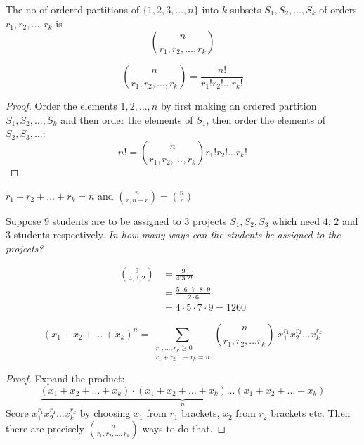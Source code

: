 \documentclass[twoside]{scrartcl}
\begin{document}
\begin{definition}
The no of ordered partitions of $\{1,2,3,\dots,n\}$ into $k$ subsets $S_1,S_2,\dots,S_k$ of orders $r_1,r_2,\dots,r_k$ is 
\[\binom{n}{r_1,r_2,\dots,r_k}\]	
\end{definition}\vspace*{5pt}

\begin{proposition}
	\[\binom{n}{r_1,r_2,\dots,r_k} = \frac{n!}{r_1!r_2!\dots r_k!}\]	
\end{proposition}
\begin{proof}
	Order the elements $1,2,\dots,n$ by first making an ordered partition $S_1,S_2,\dots,S_k$ and then order the elements of $S_1$, then order the elements of $S_2, S_3,\dots$: 
	\[n! = \binom{n}{r_1,r_2,\dots,r_k}r_1!r_2!\dots r_k!\]
\end{proof}

\begin{remark}
$r_1+r_2 + \dots + r_k = n$ and $\binom{n}{r,n-r} = \binom{n}{r}$	
\end{remark}

\begin{example}
Suppose $9$ students are to be assigned to $3$ projects $S_1,S_2,S_3$ which need $4,\,2$ and $3$ students respectively. 
\emph{In how many ways can the students be assigned to the projects?}

\[
\begin{aligned}
  \binom{9}{4,3,2} &= \frac{9!}{4!3!2!}\\
  &= \frac{5\cdot 6\cdot 7\cdot 8\cdot 9}{2\cdot 6}\\
  &= 4\cdot 5 \cdot 7 \cdot 9 = 1260
\end{aligned}
\]
\end{example}\vspace*{5pt}

\begin{theorem}
\[(x_1 + x_2 + \dots + x_k)^n = \sum_{\substack{r_1,\dots,r_k\geq 0\\r_1+r_2\dots+r_k = n}} \binom{n}{r_1,r_2,\dots r_k}\;x_1^{r_1}x_2^{r_2}\dots x_k^{r_k}\]
\end{theorem}

\begin{proof}
Expand the product:
\[\underbrace{(x_1+x_2+\dots+x_k)\cdot(x_1+x_2+\dots + x_k) \dots (x_1 + x_2 + \dots + x_k)}_{n}\]
Score $x_1^{r_1}x_2^{r_2}\dots x_k^{r_k}$ by choosing $x_1$ from $r_1$ brackets, $x_2$ from $r_2$ brackets etc. Then there are precisely $\binom{n}{r_1,r_2,\dots,r_k}$ ways to do that. 
\end{proof}
\end{document}
